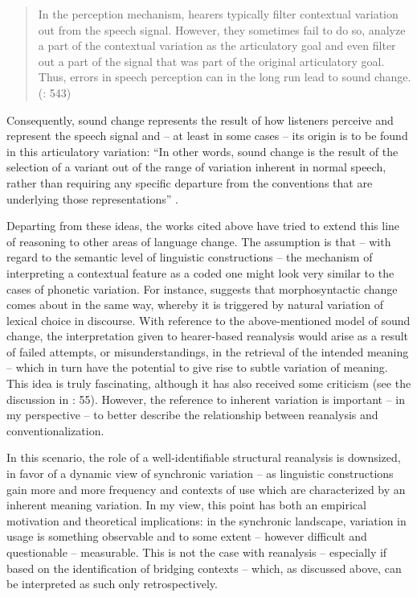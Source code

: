 \begin{quote}
In the perception mechanism, hearers typically filter contextual variation out from the speech signal. However, they sometimes fail to do so, analyze a part of the contextual variation as the articulatory goal and even filter out a part of the signal that was part of the original articulatory goal. Thus, errors in speech perception can in the long run lead to sound change. (\citealt{EhmerRosemeyer2018}: 543)
\end{quote}

Consequently, sound change represents the result of how listeners perceive and represent the speech signal and – at least in some cases – its origin is to be found in this articulatory variation: “In other words, sound change is the result of the selection of a variant out of the range of variation inherent in normal speech, rather than requiring any specific departure from the conventions that are underlying those representations” \citep[54]{Waltereit2012}.

Departing from these ideas, the works cited above have tried to extend this line of reasoning to other areas of language change. The assumption is that – with regard to the semantic level of linguistic constructions – the mechanism of interpreting a contextual feature as a coded one might look very similar to the cases of phonetic variation. For instance, \citet{Croft2010} suggests that morphosyntactic change comes about in the same way, whereby it is triggered by natural variation of lexical choice in discourse. With reference to the above-mentioned model of sound change, the interpretation given to hearer-based reanalysis would arise as a result of failed attempts, or misunderstandings, in the retrieval of the intended meaning – which in turn have the potential to give rise to subtle variation of meaning. This idea is truly fascinating, although it has also received some criticism (see the discussion in \citealt{Waltereit2012}: 55). However, the reference to inherent variation is important – in my perspective – to better describe the relationship between reanalysis and conventionalization.

In this scenario, the role of a well-identifiable structural reanalysis is downsized, in favor of a dynamic view of synchronic variation – as linguistic constructions gain more and more frequency and contexts of use which are characterized by an inherent meaning variation. In my view, this point has both an empirical motivation and theoretical implications: in the synchronic landscape, variation in usage is something observable and to some extent – however difficult and questionable – measurable. This is not the case with reanalysis – especially if based on the identification of bridging contexts – which, as discussed above, can be interpreted as such only retrospectively.

